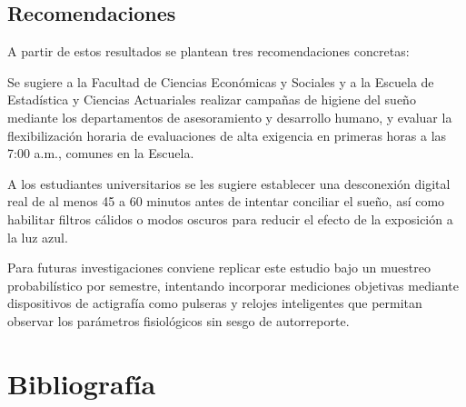 \documentclass[12pt, letterpaper]{article}
\begin{document}
\subsection{Recomendaciones}

A partir de estos resultados se plantean tres recomendaciones concretas:

Se sugiere a la Facultad de Ciencias Económicas y Sociales y a la Escuela de Estadística y Ciencias Actuariales realizar campañas de higiene del sueño mediante los departamentos de asesoramiento y desarrollo humano, y evaluar la flexibilización horaria de evaluaciones de alta exigencia en primeras horas a las 7:00 a.m., comunes en la Escuela.

A los estudiantes universitarios se les sugiere establecer una desconexión digital real de al menos 45 a 60 minutos antes de intentar conciliar el sueño, así como habilitar filtros cálidos o modos oscuros para reducir el efecto de la exposición a la luz azul.

Para futuras investigaciones conviene replicar este estudio bajo un muestreo probabilístico por semestre, intentando incorporar mediciones objetivas mediante dispositivos de actigrafía como pulseras y relojes inteligentes que permitan observar los parámetros fisiológicos sin sesgo de autorreporte.


\section{Bibliografía}
\end{document}
